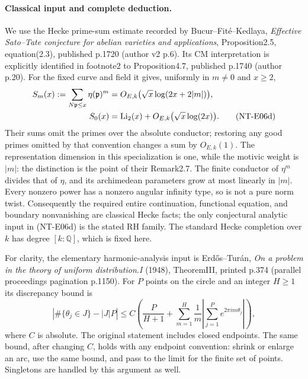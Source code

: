 \paragraph{Classical input and complete deduction.}
We use the Hecke prime-sum estimate recorded by Bucur--Fit\'e--Kedlaya,
\emph{Effective Sato--Tate conjecture for abelian varieties and
applications}, Proposition2.5, equation(2.3), published p.1720
(author v2 p.6). Its CM interpretation is explicitly identified in
footnote2 to Proposition4.7, published p.1740 (author p.20).
For the fixed curve and field it gives, uniformly in $m\ne0$ and $x\ge2$,
\begin{align}
 S_m(x):=\sum_{N\mathfrak p\le x}\eta(\mathfrak p)^m
       &=O_{E,k}\bigl(\sqrt x\log(2x+2|m|)\bigr),\notag\\
 S_0(x)&=\operatorname{Li}_2(x)
       +O_{E,k}\bigl(\sqrt x\log(2x)\bigr).               \tag{NT-E06d}
\end{align}
Their sums omit the primes over the absolute conductor; restoring any
good primes omitted by that convention changes a sum by $O_{E,k}(1)$.
The representation dimension in this specialization is one, while the
motivic weight is $|m|$: the distinction is the point of their
Remark2.7. The finite conductor of $\eta^m$ divides that of $\eta$,
and its archimedean parameters grow at most linearly in $|m|$.
Every nonzero power has a nonzero angular infinity type, so is not
a pure norm twist. Consequently the required entire continuation,
functional equation, and boundary nonvanishing are classical Hecke
facts; the only conjectural analytic input in (NT-E06d) is the
stated RH family. The standard Hecke completion over $k$ has
degree $[k:\mathbb Q]$, which is fixed here.

For clarity, the elementary harmonic-analysis input is
Erd\H{o}s--Tur\'an, \emph{On a problem in the theory of uniform
distribution.I} (1948), TheoremIII, printed p.374 (parallel
proceedings pagination p.1150). For $P$ points on the circle and an
integer $H\ge1$ its discrepancy bound is
\[
 \left|\#\{\theta_j\in J\}-|J|P\right|
 \le C\left(\frac P{H+1}
       +\sum_{m=1}^{H}\frac1m
                    \left|\sum_{j=1}^{P}e^{2\pi i m\theta_j}\right|\right),
                                                               \tag{NT-E06e}
\]
where $C$ is absolute. The original statement includes closed
endpoints. The same bound, after changing $C$, holds with any endpoint
convention: shrink or enlarge an arc, use the same bound, and pass to
the limit for the finite set of points. Singletons are handled by this
argument as well.

